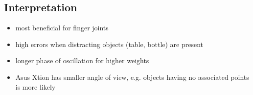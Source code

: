 \subsection{Interpretation}

\begin{itemize}
\item most beneficial for finger joints
\item high errors when distracting objects (table, bottle) are present
\item longer phase of oscillation for higher weights
\item Asus Xtion has smaller angle of view, e.g. objects having no associated points is more likely
\end{itemize}